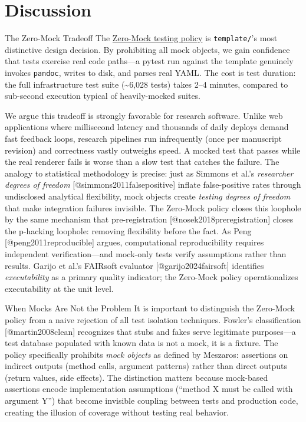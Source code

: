 \documentclass[
  ignorenonframetext,
]{beamer}
\author{\texorpdfstring{}{}}
\date{}
\begin{document}
\section{Discussion}\label{discussion}

\begin{frame}[fragile]{The Zero-Mock Tradeoff}
\protect{}\label{the-zero-mock-tradeoff}
The \href{03e_quality.md\#zero-mock-testing-policy}{Zero-Mock testing
policy} is \texttt{template/}'s most distinctive design decision. By
prohibiting all mock objects, we gain confidence that tests exercise
real code paths---a pytest run against the template genuinely invokes
\texttt{pandoc}, writes to disk, and parses real YAML. The cost is test
duration: the full infrastructure test suite (\textasciitilde6,028
tests) takes 2--4 minutes, compared to sub-second execution typical of
heavily-mocked suites.

We argue this tradeoff is strongly favorable for research software.
Unlike web applications where millisecond latency and thousands of daily
deploys demand fast feedback loops, research pipelines run infrequently
(once per manuscript revision) and correctness vastly outweighs speed. A
mocked test that passes while the real renderer fails is worse than a
slow test that catches the failure. The analogy to statistical
methodology is precise: just as Simmons et al.'s \emph{researcher
degrees of freedom} {[}@simmons2011falsepositive{]} inflate
false-positive rates through undisclosed analytical flexibility, mock
objects create \emph{testing degrees of freedom} that make integration
failures invisible. The Zero-Mock policy closes this loophole by the
same mechanism that pre-registration {[}@nosek2018preregistration{]}
closes the p-hacking loophole: removing flexibility before the fact. As
Peng {[}@peng2011reproducible{]} argues, computational reproducibility
requires independent verification---and mock-only tests verify
assumptions rather than results. Garijo et al.'s FAIRsoft evaluator
{[}@garijo2024fairsoft{]} identifies \emph{executability} as a primary
quality indicator; the Zero-Mock policy operationalizes executability at
the unit level.

\begin{block}{When Mocks Are Not the Problem}
\protect{}\label{when-mocks-are-not-the-problem}
It is important to distinguish the Zero-Mock policy from a naive
rejection of all test isolation techniques. Fowler's classification
{[}@martin2008clean{]} recognizes that stubs and fakes serve legitimate
purposes---a test database populated with known data is not a mock, it
is a fixture. The policy specifically prohibits \emph{mock objects} as
defined by Meszaros: assertions on indirect outputs (method calls,
argument patterns) rather than direct outputs (return values, side
effects). The distinction matters because mock-based assertions encode
implementation assumptions (``method X must be called with argument Y'')
that become invisible coupling between tests and production code,
creating the illusion of coverage without testing real behavior.
\end{block}


\end{frame}
\end{document}
